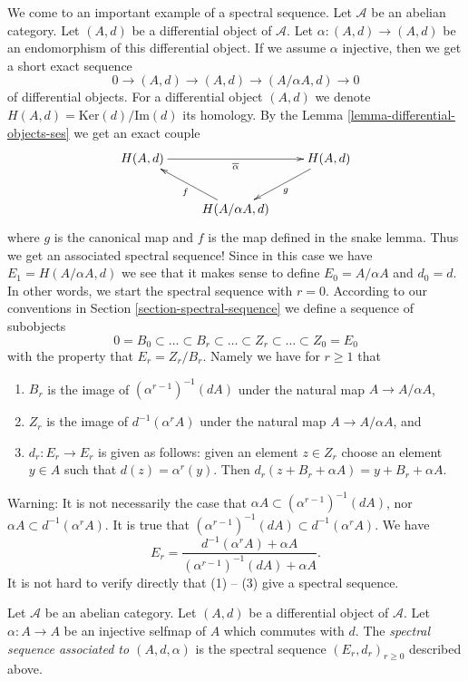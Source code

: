 \noindent
We come to an important example of a spectral sequence.
Let $\mathcal{A}$ be an abelian category.
Let $(A, d)$ be a differential object of $\mathcal{A}$.
Let $\alpha : (A, d) \to (A, d)$ be an endomorphism of this differential
object. If we assume $\alpha$ injective, then we get a short exact sequence
$$
0 \to (A, d) \to (A, d) \to (A/\alpha A, d) \to 0
$$
of differential objects. For a differential object $(A, d)$ we denote
$H(A, d) = \text{Ker}(d)/\text{Im}(d)$ its homology. By the
Lemma \ref{lemma-differential-objects-ses} we get an exact couple
$$
\xymatrix{
H(A, d) \ar[rr]_{\overline{\alpha}} & & H(A, d) \ar[ld]^g \\
& H(A/\alpha A, d) \ar[lu]^f &
}
$$
where $g$ is the canonical map and $f$ is the map defined in the snake lemma.
Thus we get an associated spectral sequence!
Since in this case we have $E_1 = H(A/\alpha A, d)$ we
see that it makes sense to define $E_0 = A/\alpha A$
and $d_0 = d$. In other words, we start the spectral sequence
with $r = 0$. According to our conventions in
Section \ref{section-spectral-sequence} we define a sequence of subobjects
$$
0 = B_0 \subset \ldots \subset B_r \subset \ldots
\subset Z_r \subset \ldots \subset Z_0 = E_0
$$
with the property that $E_r = Z_r/B_r$. Namely we have
for $r \geq 1$ that
\begin{enumerate}
\item $B_r$ is the image of $(\alpha^{r - 1})^{-1}(d A)$
under the natural map $A \to A/\alpha A$,
\item $Z_r$ is the image of $d^{-1}(\alpha^r A)$
under the natural map $A \to A/\alpha A$, and
\item $d_r : E_r \to E_r$ is given as follows: given an element $z \in Z_r$
choose an element $y \in A$ such that $d(z) = \alpha^r(y)$. Then
$d_r(z + B_r + \alpha A) = y + B_r + \alpha A$.
\end{enumerate}
Warning: It is not necessarily the case that
$\alpha A \subset (\alpha^{r - 1})^{-1}(dA)$, nor
$\alpha A \subset d^{-1}(\alpha^r A)$. It is true that
$(\alpha^{r - 1})^{-1}(dA) \subset d^{-1}(\alpha^r A)$.
We have
$$
E_r
=
\frac{d^{-1}(\alpha^r A) + \alpha A}{(\alpha^{r - 1})^{-1}(dA) + \alpha A}.
$$
It is not hard to verify directly that (1) -- (3) give a spectral sequence.

\begin{definition}
\label{definition-differential-object-selfmap}
Let $\mathcal{A}$ be an abelian category.
Let $(A, d)$ be a differential object of $\mathcal{A}$.
Let $\alpha : A \to A$ be an injective selfmap of $A$ which
commutes with $d$. The {\it spectral sequence associated to
$(A, d, \alpha)$} is the spectral sequence
$(E_r, d_r)_{r \geq 0}$ described above.
\end{definition}








